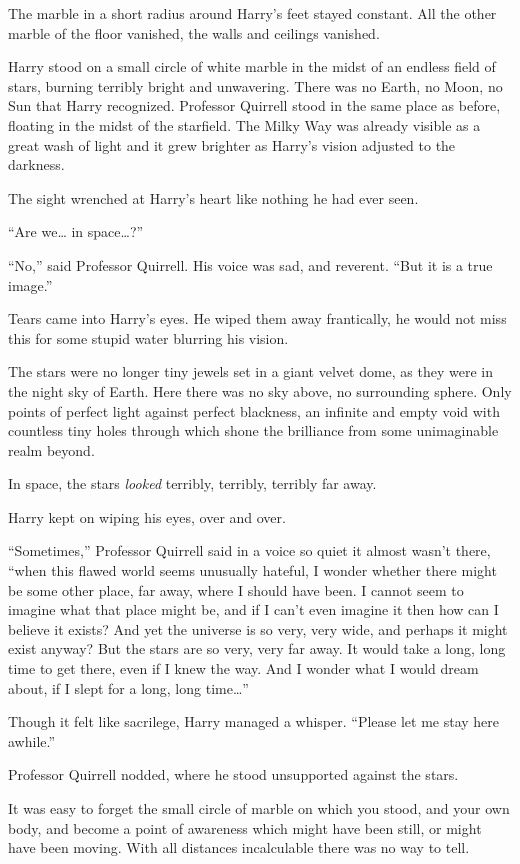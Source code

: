 The marble in a short radius around Harry's feet stayed constant. All
the other marble of the floor vanished, the walls and ceilings vanished.

Harry stood on a small circle of white marble in the midst of an endless
field of stars, burning terribly bright and unwavering. There was no
Earth, no Moon, no Sun that Harry recognized. Professor Quirrell stood
in the same place as before, floating in the midst of the starfield. The
Milky Way was already visible as a great wash of light and it grew
brighter as Harry's vision adjusted to the darkness.

The sight wrenched at Harry's heart like nothing he had ever seen.

``Are we\ldots{} in space\ldots{}?''

``No,'' said Professor Quirrell. His voice was sad, and reverent. ``But
it is a true image.''

Tears came into Harry's eyes. He wiped them away frantically, he would
not miss this for some stupid water blurring his vision.

The stars were no longer tiny jewels set in a giant velvet dome, as they
were in the night sky of Earth. Here there was no sky above, no
surrounding sphere. Only points of perfect light against perfect
blackness, an infinite and empty void with countless tiny holes through
which shone the brilliance from some unimaginable realm beyond.

In space, the stars \emph{looked} terribly, terribly, terribly far away.

Harry kept on wiping his eyes, over and over.

``Sometimes,'' Professor Quirrell said in a voice so quiet it almost
wasn't there, ``when this flawed world seems unusually hateful, I wonder
whether there might be some other place, far away, where I should have
been. I cannot seem to imagine what that place might be, and if I can't
even imagine it then how can I believe it exists? And yet the universe
is so very, very wide, and perhaps it might exist anyway? But the stars
are so very, very far away. It would take a long, long time to get
there, even if I knew the way. And I wonder what I would dream about, if
I slept for a long, long time\ldots{}''

Though it felt like sacrilege, Harry managed a whisper. ``Please let me
stay here awhile.''

Professor Quirrell nodded, where he stood unsupported against the stars.

It was easy to forget the small circle of marble on which you stood, and
your own body, and become a point of awareness which might have been
still, or might have been moving. With all distances incalculable there
was no way to tell.

